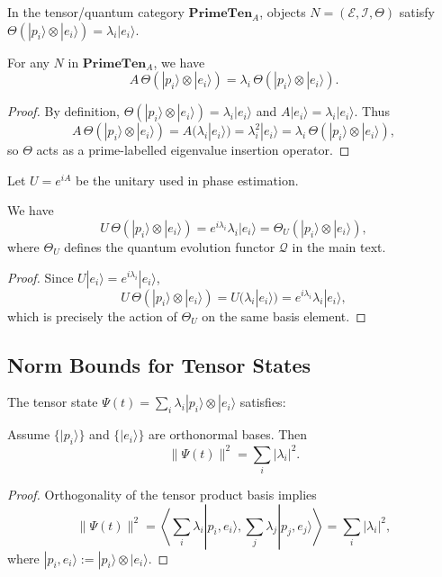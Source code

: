 \documentclass[11pt]{article}
\begin{document}
In the tensor/quantum category $\mathbf{PrimeTen}_A$, objects
$N=(\mathcal{E},\mathcal{I},\Theta)$ satisfy
$\Theta(|p_i\rangle\otimes|e_i\rangle) = \lambda_i |e_i\rangle$.

\begin{lemma}
For any $N$ in $\mathbf{PrimeTen}_A$, we have
\[
A\,\Theta(|p_i\rangle\otimes|e_i\rangle)
= \lambda_i\,\Theta(|p_i\rangle\otimes|e_i\rangle).
\]
\end{lemma}

\begin{proof}
By definition,
$\Theta(|p_i\rangle\otimes|e_i\rangle) = \lambda_i |e_i\rangle$ and
$A|e_i\rangle = \lambda_i |e_i\rangle$. Thus
\[
A\,\Theta(|p_i\rangle\otimes|e_i\rangle) =
A(\lambda_i |e_i\rangle)=\lambda_i^2 |e_i\rangle =
\lambda_i\,\Theta(|p_i\rangle\otimes|e_i\rangle),
\]
so $\Theta$ acts as a prime-labelled eigenvalue insertion operator.
\end{proof}

Let $U=e^{iA}$ be the unitary used in phase estimation.\cite{PrimeEigenSolvers}

\begin{lemma}
We have
\[
U\,\Theta(|p_i\rangle\otimes|e_i\rangle) =
e^{i\lambda_i}\lambda_i |e_i\rangle =
\Theta_U(|p_i\rangle\otimes|e_i\rangle),
\]
where $\Theta_U$ defines the quantum evolution functor
$\mathcal{Q}$ in the main text.
\end{lemma}

\begin{proof}
Since $U|e_i\rangle = e^{i\lambda_i} |e_i\rangle$,
\[
U\,\Theta(|p_i\rangle\otimes|e_i\rangle) =
U(\lambda_i |e_i\rangle) = e^{i\lambda_i}\lambda_i |e_i\rangle,
\]
which is precisely the action of $\Theta_U$ on the same basis element.
\end{proof}

\subsection{Norm Bounds for Tensor States}

The tensor state
$\Psi(t) = \sum_i \lambda_i |p_i\rangle\otimes|e_i\rangle$ satisfies:

\begin{lemma}
Assume $\{|p_i\rangle\}$ and $\{|e_i\rangle\}$ are orthonormal bases.
Then
\[
\|\Psi(t)\|^2 = \sum_i |\lambda_i|^2.
\]
\end{lemma}

\begin{proof}
Orthogonality of the tensor product basis implies
\[
\|\Psi(t)\|^2 =
\left\langle \sum_i \lambda_i |p_i,e_i\rangle,
\sum_j \lambda_j |p_j,e_j\rangle \right\rangle
=
\sum_i |\lambda_i|^2,
\]
where $|p_i,e_i\rangle := |p_i\rangle\otimes|e_i\rangle$.
\end{proof}
\end{document}
